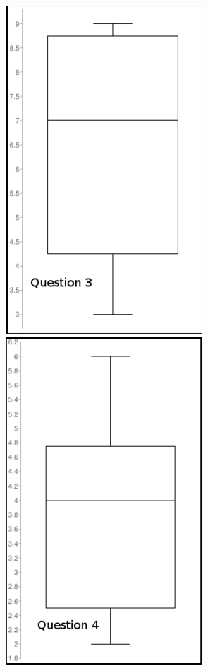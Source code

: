 \begin{center}
\begin{figure}[H]
\includegraphics[scale=0.45]{images/q3}
\includegraphics[scale=0.45]{images/q4}

\end{figure}
\end{center}
